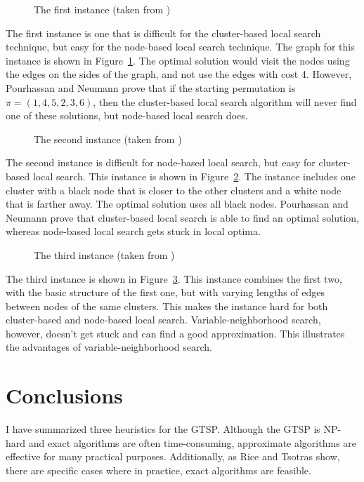 \documentclass{sig-alternate}
\begin{document}
\begin{figure}[t]
\centering
{}
\caption{The first instance (taken from \cite{Pourhassan:2015})}
\label{fig:Pourhassan1}
\end{figure}

The first instance is one that is difficult for the cluster-based local search technique, but easy for the node-based local search technique. The graph for this instance is shown in Figure~\ref{fig:Pourhassan1}. The optimal solution would visit the nodes using the edges on the sides of the graph, and not use the edges with cost 4. However, Pourhassan and Neumann \cite{Pourhassan:2015} prove that if the starting permutation is $\pi=(1,4,5,2,3,6)$, then the cluster-based local search algorithm will never find one of these solutions, but node-based local search does. 

\begin{figure}[h]
\centering
{}
\caption{The second instance (taken from \cite{Pourhassan:2015})}
\label{fig:Pourhassan2}
\end{figure}

The second instance is difficult for node-based local search, but easy for cluster-based local search. This instance is shown in Figure~\ref{fig:Pourhassan2}. The instance includes one cluster with a black node that is closer to the other clusters and a white node that is farther away. The optimal solution uses all black nodes. Pourhassan and Neumann \cite{Pourhassan:2015} prove that cluster-based local search is able to find an optimal solution, whereas node-based local search gets stuck in local optima. 

\begin{figure}
\centering
{}
\caption{The third instance (taken from \cite{Pourhassan:2015})}
\label{fig:Pourhassan3}
\end{figure}

The third instance is shown in Figure~\ref{fig:Pourhassan3}. This instance combines the first two, with the basic structure of the first one, but with varying lengths of edges between nodes of the same clusters. This makes the instance hard for both cluster-based and node-based local search. Variable-neighborhood search, however, doesn't get stuck and can find a good approximation. This illustrates the advantages of variable-neighborhood search. 

\section{Conclusions}
\label{sec:conclusions}
I have summarized three heuristics for the GTSP. Although the GTSP is NP-hard and exact algorithms are often time-consuming, approximate algorithms are effective for many practical purposes. Additionally, as Rice and Tsotras \cite{Rice:2013} show, there are specific cases where in practice, exact algorithms are feasible. 
\end{document}
